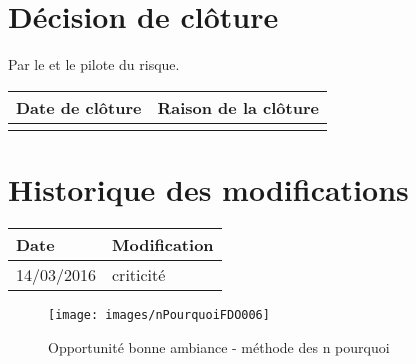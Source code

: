 \section*{Décision de clôture}
Par le \CP{} et le pilote du risque.
\begin{table}[h]
\centering
	\begin{tabularx}{16.8cm}{|X|X|}
	\hline
	\rowcolor{gray!40} Date de clôture & Raison de la clôture \\
	\hline
	  & \\
	\hline
	\end{tabularx}
\end{table}

\section*{Historique des modifications}
\begin{table}[h]
\centering
	\begin{tabularx}{16.8cm}{|X|X|}
	\hline
	\rowcolor{gray!40} Date & Modification \\%
	\hline
	14/03/2016  & criticité \\
	\hline
	\end{tabularx}
\end{table}
\newpage


\begin{figure}
	\centering
	\texttt{[image: images/nPourquoiFDO006]}
	\caption{\label{opportunite bonne ambiance}Opportunité bonne ambiance - méthode des n pourquoi}
\end{figure}